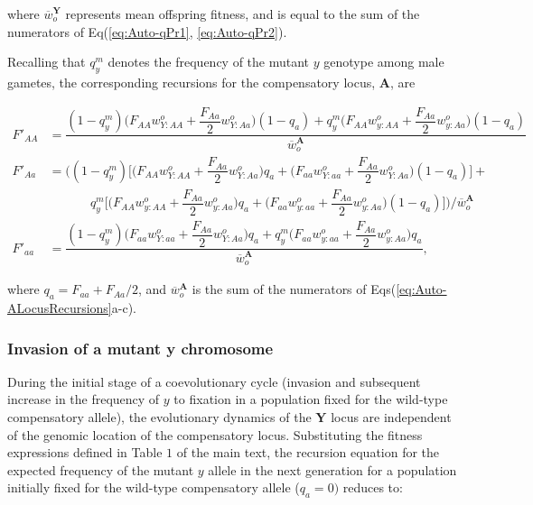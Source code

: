 \documentclass{article}
\newcommand\hl[1]{%
  \bgroup
  \hskip0pt\color{blue!80!black}%
  #1%
  \egroup
}
\begin{document}
\noindent where $\overline{w}^{\mathbf{Y}}_{o}$ represents mean offspring fitness, and is equal to the sum of the numerators of Eq(\ref{eq:Auto-qPr1}, \ref{eq:Auto-qPr2}).

Recalling that $q^{m}_{y}$ denotes the frequency of the mutant $y$ genotype among male gametes, the corresponding recursions for the compensatory locus, $\mathbf{A}$, are

\begin{subequations}\label{eq:Auto-ALocusRecursions} 
	\begin{align} 
		F'_{AA} &= \dfrac{ (1 - q^{m}_{y}) \bigg(F_{AA} w^{o}_{Y:AA} + \dfrac{F_{Aa}}{2} w^{o}_{Y:Aa} \bigg) (1 - q_a) + q^{m}_{y} \bigg(F_{AA} w^{o}_{y:AA} + \dfrac{F_{Aa}}{2} w^{o}_{y:Aa} \bigg) (1 - q_a)}{\overline{w}^{\mathbf{A}}_o} \label{eq:Auto-ARec1} \\ 
		F'_{Aa} &= \Bigg( (1 - q^{m}_{y}) \Bigg[ \bigg( F_{AA} w^{o}_{Y:AA} + \dfrac{F_{Aa}}{2} w^{o}_{Y:Aa} \bigg) q_a + \bigg( F_{aa} w^{o}_{Y:aa} + \dfrac{F_{Aa}}{2} w^{o}_{Y:Aa} \bigg) (1 - q_a) \bigg] +\nonumber \\
		&~~~~~~~~~~~~~~~q^{m}_{y} \Bigg[ \bigg( F_{AA} w^{o}_{y:AA} + \dfrac{F_{Aa}}{2} w^{o}_{y:Aa} \bigg) q_a	+ \bigg(F_{aa} w^{o}_{y:aa} + \dfrac{F_{Aa}}{2} w^{o}_{y:Aa} \bigg) (1 - q_a) \Bigg] \Bigg) \Bigg/ {\overline{w}^{\mathbf{A}}_o} \label{eq:Auto-ARec2}\\ 
		F'_{aa} &= \dfrac{ (1 - q^{m}_{y}) \bigg( F_{aa} w^{o}_{Y:aa} + \dfrac{F_{Aa}}{2} w^{o}_{Y:Aa} \bigg) q_a + q^{m}_{y} \bigg(F_{aa} w^{o}_{y:aa} + \dfrac{F_{Aa}}{2} w^{o}_{y:Aa} \bigg) q_a}{\overline{w}^{\mathbf{A}}_o}, \label{eq:Auto-ARec3}
	\end{align}
\end{subequations}

\noindent where $q_a = F_{aa} + F_{Aa}/2$, and $\overline{w}^{\mathbf{A}}_o$ is the sum of the numerators of Eqs(\ref{eq:Auto-ALocusRecursions}a-c).


\subsubsection{Invasion of a mutant y chromosome}

During the initial stage of a coevolutionary cycle (invasion and subsequent increase in the frequency of $y$ to fixation in a population fixed for the wild-type compensatory allele), the evolutionary dynamics of the $\mathbf{Y}$ locus are independent of the genomic location of the compensatory locus. Substituting the fitness expressions defined in \hl{Table $1$} of the main text, the recursion equation for the expected frequency of the mutant $y$ allele in the next generation for a population initially fixed for the wild-type compensatory allele ($q_a = 0)$ reduces to:
\end{document}
